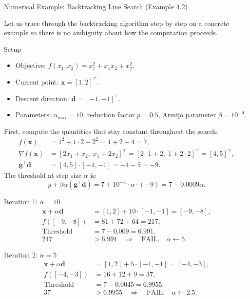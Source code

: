 \documentclass[aspectratio=169,10pt]{beamer}
\newcommand{\bx}{\mathbf{x}}
\newcommand{\bd}{\mathbf{d}}
\newcommand{\bg}{\mathbf{g}}
\newcommand{\grad}{\nabla}
\begin{document}
\begin{frame}[allowframebreaks]{Numerical Example: Backtracking Line Search (Example 4.2)}

  Let us trace through the backtracking algorithm step by step on a
  concrete example so there is no ambiguity about how the computation
  proceeds.

  \begin{block}{Setup}
    \begin{itemize}
      \item Objective: $f(x_1, x_2) = x_1^2 + x_1 x_2 + x_2^2$.
      \item Current point: $\bx = [1, 2]^{\top}$.
      \item Descent direction: $\bd = [-1, -1]^{\top}$.
      \item Parameters: $\alpha_{\max} = 10$, reduction factor $p = 0.5$,
            Armijo parameter $\beta = 10^{-4}$.
    \end{itemize}
  \end{block}

  First, compute the quantities that stay constant throughout the search:
  \begin{align*}
    f(\bx) &= 1^2 + 1\cdot 2 + 2^2 = 1 + 2 + 4 = 7, \\
    \grad f(\bx) &= [2x_1 + x_2,\; x_1 + 2x_2]^{\top}
                  = [2\cdot1+2,\; 1+2\cdot2]^{\top}
                  = [4, 5]^{\top}, \\
    \bg^{\top}\bd &= [4, 5]\cdot[-1,-1] = -4 - 5 = -9.
  \end{align*}
  The threshold at step size $\alpha$ is:
  \[
    y + \beta\alpha(\bg^{\top}\bd)
    = 7 + 10^{-4}\cdot\alpha\cdot(-9)
    = 7 - 0.0009\alpha.
  \]

  \framebreak

  \begin{exampleblock}{Iteration 1: $\alpha = 10$}
    \begin{align*}
      \bx + \alpha\bd &= [1,2] + 10\cdot[-1,-1] = [-9,-8], \\
      f([-9,-8]) &= 81 + 72 + 64 = 217, \\
      \text{Threshold} &= 7 - 0.009 = 6.991.\\
      217 &> 6.991 \quad \Rightarrow \quad \text{FAIL.} \quad \alpha \leftarrow 5.
    \end{align*}
  \end{exampleblock}

  \begin{exampleblock}{Iteration 2: $\alpha = 5$}
    \begin{align*}
      \bx + \alpha\bd &= [1,2] + 5\cdot[-1,-1] = [-4,-3], \\
      f([-4,-3]) &= 16 + 12 + 9 = 37, \\
      \text{Threshold} &= 7 - 0.0045 = 6.9955.\\
      37 &> 6.9955 \quad \Rightarrow \quad \text{FAIL.} \quad \alpha \leftarrow 2.5.
    \end{align*}
  \end{exampleblock}


\end{frame}
\end{document}
